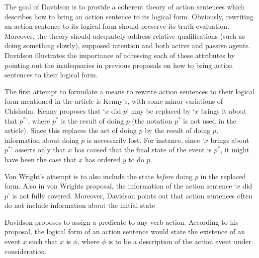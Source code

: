 \documentclass{article}
\begin{document}
\maketitle

The goal of Davidson is to provide a coherent theory of action sentences which
describes how to bring an action sentence to its logical form. Obviously,
rewriting an action sentence to its logical form should preserve its truth
evaluation. Moreover, the theory should adequately address relative 
qualifications (such as doing something slowly), supposed intention and
both active and passive agents. Davidson illustrates the importance of adressing
each of these attributes by pointing out the inadequacies in previous
proposals on how to bring action sentences to their logical form.

The first attempt to formulate a means to rewrite action sentences to their
logical form mentioned in the article is Kenny's, with some minor variations of
Chisholm. Kenny proposes that `$x$ did $p$' may be replaced by
`$x$ brings it about that $p^*$', where $p^*$ is the result of doing $p$ (the
notation $p^*$ is not used in the article). Since this replaces
the act of doing $p$ by the result of doing $p$, information about doing $p$
is necessarily lost. For instance, since `$x$ brings about $p^*$' asserts only 
that $x$ has caused that the final state of the event is $p^*$, it might have
been the case that $x$ has ordered $y$ to do $p$. 

Von Wright's attempt is to also include the state
\emph{before} doing $p$ in the replaced form. Also in von Wrights proposal, the
information of the action sentence `$x$ did $p$' is not fully covered. Moreover,
Davidson points out that action sentences often do not include information
about the initial state

Davidson proposes to assign a predicate to any verb action. According to his
proposal, the logical
form of an action sentence would state the existence of an event $x$ such that
$x$ is $\phi$, where $\phi$ is to be a description of the action event under
consideration. 
\end{document}
